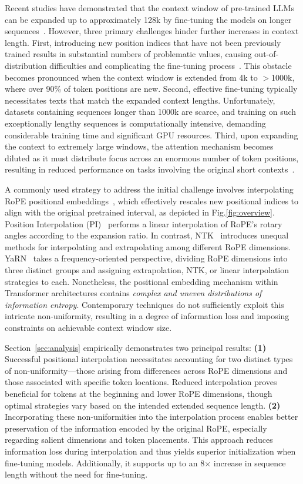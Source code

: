 Recent studies have demonstrated that the context window of pre-trained LLMs can be expanded up to approximately 128k by fine-tuning the models on longer sequences~\cite{longlora,pi,yarn,zhang2024soaring,liu2023scaling}. However, three primary challenges hinder further increases in context length. First, introducing new position indices that have not been previously trained results in substantial numbers of problematic values, causing out-of-distribution difficulties and complicating the fine-tuning process~\cite{pi}. This obstacle becomes pronounced when the context window is extended from 4k to $>$1000k, where over 90\% of token positions are new. Second, effective fine-tuning typically necessitates texts that match the expanded context lengths. Unfortunately, datasets containing sequences longer than 1000k are scarce, and training on such exceptionally lengthy sequences is computationally intensive, demanding considerable training time and significant GPU resources. Third, upon expanding the context to extremely large windows, the attention mechanism becomes diluted as it must distribute focus across an enormous number of token positions, resulting in reduced performance on tasks involving the original short contexts~\cite{pi}.

A commonly used strategy to address the initial challenge involves interpolating RoPE positional embeddings~\cite{rope,pi}, which effectively rescales new positional indices to align with the original pretrained interval, as depicted in Fig.\ref{fig:overview}. Position Interpolation (PI)~\cite{pi} performs a linear interpolation of RoPE’s rotary angles according to the expansion ratio. In contrast, NTK~\cite{ntk,dynamicntk} introduces unequal methods for interpolating and extrapolating among different RoPE dimensions. YaRN~\cite{yarn} takes a frequency-oriented perspective, dividing RoPE dimensions into three distinct groups and assigning extrapolation, NTK, or linear interpolation strategies to each. Nonetheless, the positional embedding mechanism within Transformer architectures contains \emph{complex and uneven distributions of information entropy}. Contemporary techniques do not sufficiently exploit this intricate non-uniformity, resulting in a degree of information loss and imposing constraints on achievable context window size.

Section~\ref{sec:analysis} empirically demonstrates two principal results: \textbf{(1)} Successful positional interpolation necessitates accounting for two distinct types of non-uniformity—those arising from differences across RoPE dimensions and those associated with specific token locations. Reduced interpolation proves beneficial for tokens at the beginning and lower RoPE dimensions, though optimal strategies vary based on the intended extended sequence length.  
\textbf{(2)} Incorporating these non-uniformities into the interpolation process enables better preservation of the information encoded by the original RoPE, especially regarding salient dimensions and token placements. This approach reduces information loss during interpolation and thus yields superior initialization when fine-tuning models. Additionally, it supports up to an 8$\times$ increase in sequence length without the need for fine-tuning.

